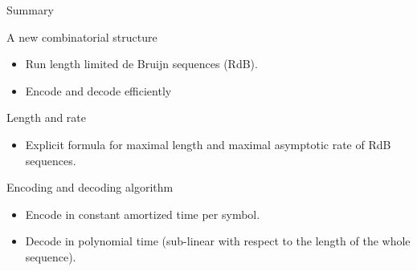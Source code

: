 \begin{frame}{Summary}
    \begin{block}{A new combinatorial structure}
        \begin{itemize}
            \item Run length limited de Bruijn sequences (RdB).
            \item Encode and decode efficiently
        \end{itemize}
    \end{block}
    
    \begin{block}{Length and rate}
        \begin{itemize}
            \item Explicit formula for maximal length and maximal asymptotic rate of RdB sequences.
        \end{itemize}
    \end{block}
    
    \begin{block}{Encoding and decoding algorithm}
        \begin{itemize}
            \item Encode in constant amortized time per symbol.
            \item Decode in polynomial time (sub-linear with respect to the length of the whole sequence).
        \end{itemize}
    \end{block}
\end{frame}

